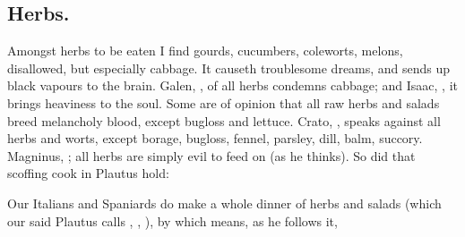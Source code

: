 \subsection{Herbs.}

Amongst herbs to be eaten I find gourds, cucumbers, coleworts, melons,
disallowed, but especially cabbage. It causeth troublesome dreams, and sends up
black vapours to the brain. Galen, , of all herbs condemns cabbage; and Isaac,  , it brings heaviness to the soul. Some are of
opinion that all raw herbs and salads breed melancholy blood, except bugloss
and lettuce. Crato, , speaks against
all herbs and worts, except borage, bugloss, fennel, parsley, dill, balm,
succory. Magninus, 
; all herbs are simply evil to
feed on (as he thinks). So did that scoffing cook in
Plautus hold:

%

Our Italians and Spaniards do make a whole dinner of herbs and salads (which
our said Plautus calls , \Horace{}, ), by which means, as he follows it,

